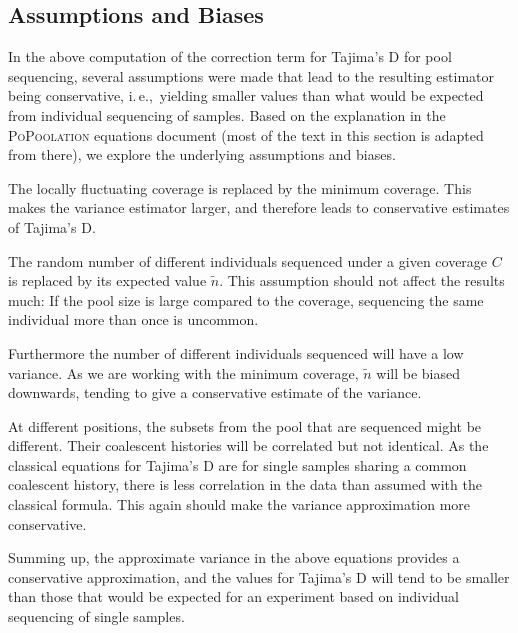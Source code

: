 \documentclass[a4paper,fontsize=9pt,DIV=14]{scrartcl}
\newcommand\toolname{\textsc}
\newcommand{\ie}{i.\,e.,~}
\begin{document}

\subsection{Assumptions and Biases}
\label{supp:sec:TajimaD:sub:AssumptionsBiases}

In the above computation of the correction term for Tajima's D for pool sequencing,
several assumptions were made that lead to the resulting estimator being conservative,
\ie yielding smaller values than what would be expected from individual sequencing of samples.
Based on the explanation in the \toolname{PoPoolation} equations document (most of the text in this section is adapted from there), we explore the underlying assumptions and biases.

The locally fluctuating coverage is replaced by the minimum coverage.
This makes the variance estimator larger, and therefore leads to conservative estimates of Tajima's D.

The random number of different individuals sequenced under a given coverage $C$
is replaced by its expected value $\tilde{n}$.
This assumption should not affect the results much:
If the pool size is large compared to the coverage, sequencing the same individual more than once is uncommon.

Furthermore the number of different individuals sequenced will have a low variance.
As we are working with the minimum coverage, $\tilde{n}$ will be biased downwards,
tending to give a conservative estimate of the variance.

At different positions, the subsets from the pool that are sequenced might be different.
Their coalescent histories will be correlated but not identical.
As the classical equations for Tajima's D are for single samples sharing a common coalescent history,
there is less correlation in the data than assumed with the classical formula.
This again should make the variance approximation more conservative.

Summing up, the approximate variance in the above equations provides a conservative approximation,
and the values for Tajima's D will tend to be smaller than those that would be expected
for an experiment based on individual sequencing of single samples.
\end{document}
